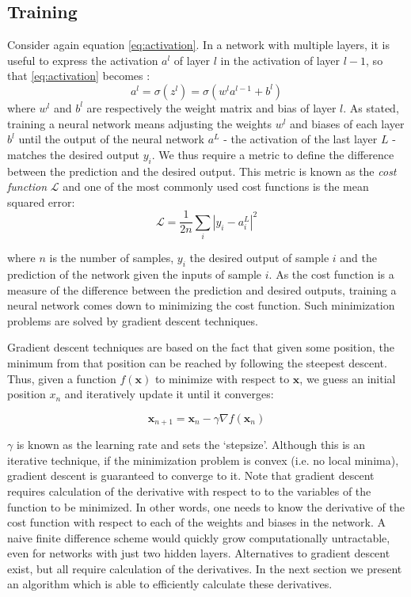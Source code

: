 \documentclass{Dissertate}
\begin{document}
\hypertarget{training}{%
\subsection{Training}\label{training}}

Consider again equation \ref{eq:activation}. In a network with
multiple layers, it is useful to express the activation \(a^l\) of layer
\(l\) in the activation of layer \(l-1\), so that
\ref{eq:activation} becomes : \begin{equation}
a^l = \sigma(z^l) = \sigma(w^la^{l-1}+b^l)
\label{eq:weighted_input}\end{equation} where \(w^l\) and \(b^l\) are
respectively the weight matrix and bias of layer \(l\). As stated,
training a neural network means adjusting the weights \(w^l\) and biases
of each layer \(b^{l}\) until the output of the neural network \(a^L\) -
the activation of the last layer \(L\) - matches the desired output
\(y_i\). We thus require a metric to define the difference between the
prediction and the desired output. This metric is known as the
\emph{cost function} \(\mathcal{L}\) and one of the most commonly used
cost functions is the mean squared error: \begin{equation}
\mathcal{L} = \frac{1}{2n}\sum_i|y_i-a^L_i|^2
\label{eq:MSE}\end{equation}

where \(n\) is the number of samples, \(y_i\) the desired output of
sample \(i\) and the prediction of the network given the inputs of
sample \(i\). As the cost function is a measure of the difference
between the prediction and desired outputs, training a neural network
comes down to minimizing the cost function. Such minimization problems
are solved by gradient descent techniques.

Gradient descent techniques are based on the fact that given some
position, the minimum from that position can be reached by
following the steepest descent. Thus, given a function \(f(\mathbf{x})\)
to minimize with respect to \(\mathbf{x}\), we guess an initial position
\(x_n\) and iteratively update it until it converges:

\begin{equation}
\mathbf{x}_{n+1} = \mathbf{x}_{n}-\gamma\nabla f(\mathbf{x}_n)
\label{eq:gradientdescent}\end{equation}

\(\gamma\) is known as the learning rate and sets the `stepsize'.
Although this is an iterative technique, if the minimization problem is
convex (i.e. no local minima), gradient descent is guaranteed to
converge to it. Note that gradient descent requires calculation of the
derivative with respect to to the variables of the function to be minimized. In other words, one needs to know the derivative of the cost function with respect to each of the weights and biases in the network. A naive finite difference
scheme would quickly grow computationally untractable, even for networks
with just two hidden layers. Alternatives to gradient descent exist, but
all require calculation of the derivatives. In the next section we
present an algorithm which is able to efficiently calculate these
derivatives.
\end{document}
